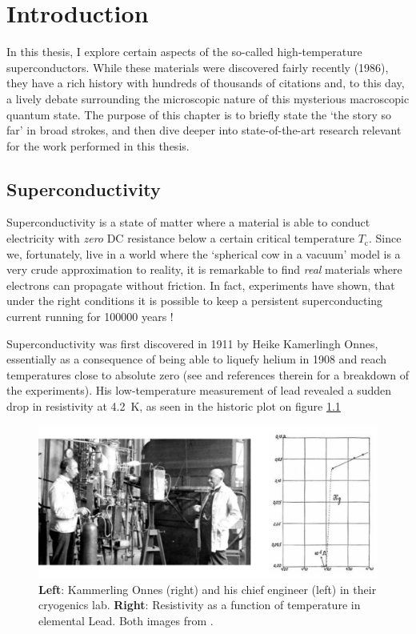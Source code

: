 \chapter{Introduction}\label{ch:intro}

In this thesis, I explore certain aspects of the so-called high-temperature superconductors. While these materials were discovered fairly recently (1986), they have a rich history with hundreds of thousands of citations and, to this day, a lively debate surrounding the microscopic nature of this mysterious macroscopic quantum state. The purpose of this chapter is to briefly state the `the story so far' in broad strokes, and then dive deeper into state-of-the-art research relevant for the work performed in this thesis.

\section{Superconductivity}
Superconductivity is a state of matter where a material is able to conduct electricity with \emph{zero} DC resistance below a certain critical temperature $T_\text{c}$. Since we, fortunately, live in a world where the `spherical cow in a vacuum' model is a very crude approximation to reality, it is remarkable to find \emph{real} materials where electrons can propagate without friction. In fact, experiments have shown, that under the right conditions it is possible to keep a persistent superconducting current running for 100000 years \cite{File1963}!

Superconductivity was first discovered in 1911 by Heike Kamerlingh Onnes, essentially as a consequence of being able to liquefy helium in 1908 and reach temperatures close to absolute zero (see \cite{VanDelft2010} and references therein for a breakdown of the experiments). His low-temperature measurement of lead revealed a sudden drop in resistivity at \SI{4.2}{\kelvin}, as seen in the historic plot on figure \ref{fig:onnes}

\begin{figure}
    \centering
    \includegraphics[width=\textwidth]{fig/intro/onnes.png}
    \caption[SC of elemental lead]{\textbf{Left}: Kammerling Onnes (right) and his chief engineer (left) in their cryogenics lab. \textbf{Right}: Resistivity as a function of temperature in elemental Lead. Both images from \cite{VanDelft2010}.}
    \label{fig:onnes}
\end{figure}

